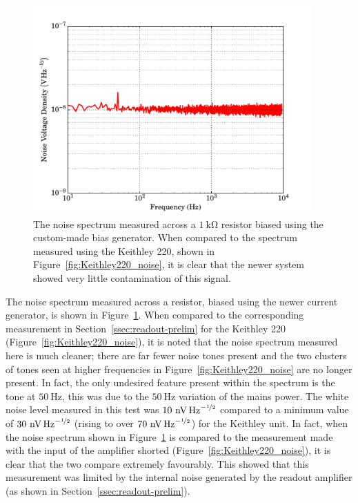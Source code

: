 \begin{figure}[t]
\begin{center}
\includegraphics[width = 0.95\textwidth]{figures/RTD_currGen_noise}
\caption[Noise spectrum from original bias generator system, used in conjunction with the initial amplifier.]{The noise spectrum measured across a $1~\mathrm{k\Omega}$ resistor biased using the custom-made bias generator. When compared to the spectrum measured using the Keithley 220, shown in Figure~\ref{fig:Keithley220_noise}, it is clear that the newer system showed very little contamination of this signal.}
\label{fig:RTD_currGen_noise}
\end{center}
\end{figure}
\par 
The noise spectrum measured across a resistor, biased using the newer current generator, is shown in Figure~\ref{fig:RTD_currGen_noise}. When compared to the corresponding measurement in Section~\ref{ssec:readout-prelim} for the Keithley 220 (Figure~\ref{fig:Keithley220_noise}), it is noted that the noise spectrum measured here is much cleaner; there are far fewer noise tones present and the two clusters of tones seen at higher frequencies in Figure~\ref{fig:Keithley220_noise} are no longer present. In fact, the only undesired feature present within the spectrum is the tone at $50~\mathrm{Hz}$, this was due to the $50~\mathrm{Hz}$ variation of the mains power. The white noise level measured in this test was $10~\mathrm{nV\,Hz}^{-\nicefrac{1}{2}}$ compared to a minimum value of $30~\mathrm{nV\,Hz}^{-\nicefrac{1}{2}}$ (rising to over $70~\mathrm{nV\,Hz}^{-\nicefrac{1}{2}}$) for the Keithley unit.  In fact, when the noise spectrum shown in Figure~\ref{fig:RTD_currGen_noise} is compared to the measurement made with the input of the amplifier shorted (Figure~\ref{fig:Keithley220_noise}), it is clear that the two compare extremely favourably. This showed that this measurement was limited by the internal noise generated by the readout amplifier (as shown in Section~\ref{ssec:readout-prelim}).
